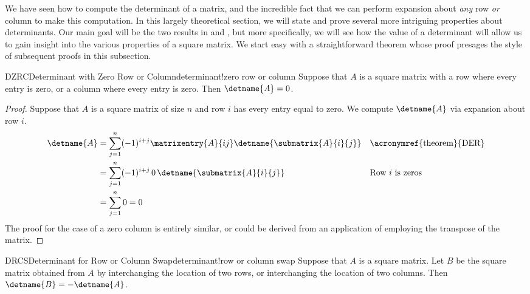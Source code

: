 %
We have seen how to compute the determinant of a matrix, and the incredible fact that we can perform expansion about {\em any} row {\em or} column to make this computation.  In this largely theoretical section, we will state and prove several more intriguing properties about determinants.  Our main goal will be the two results in  and , but more specifically, we will see how the value of a determinant will allow us to gain insight into the various properties of a square matrix.
%
%
We start easy with a straightforward theorem whose proof presages the style of subsequent proofs in this subsection.
%
\begin{theorem}{DZRC}{Determinant with Zero Row or Column}{determinant!zero row or column}
Suppose that $A$ is a square matrix with a row where every entry is zero, or a column where every entry is zero.  Then $\detname{A}=0$.
\end{theorem}
%
\begin{proof}
Suppose that $A$ is a square matrix of size $n$ and row $i$ has every entry equal to zero.  We compute $\detname{A}$ via expansion about row $i$.
%
\begin{align*}
\detname{A}
&=
\sum_{j=1}^{n}(-1)^{i+j}\matrixentry{A}{ij}\detname{\submatrix{A}{i}{j}}
&&\text{\acronymref{theorem}{DER}}\\
%
&=
\sum_{j=1}^{n}(-1)^{i+j}\,0\,\detname{\submatrix{A}{i}{j}}
&&\text{Row $i$ is zeros}\\
%
&=
\sum_{j=1}^{n}0=0
%
\end{align*}
%
The proof for the case of a zero column is entirely similar, or could be derived from an application of  employing the transpose of the matrix.
\end{proof}
%
\begin{theorem}{DRCS}{Determinant for Row or Column Swap}{determinant!row or column swap}
Suppose that $A$ is a square matrix.  Let $B$ be the square matrix obtained from $A$ by interchanging the location of two rows, or interchanging the location of two columns.  Then $\detname{B}=-\detname{A}$.
\end{theorem}
